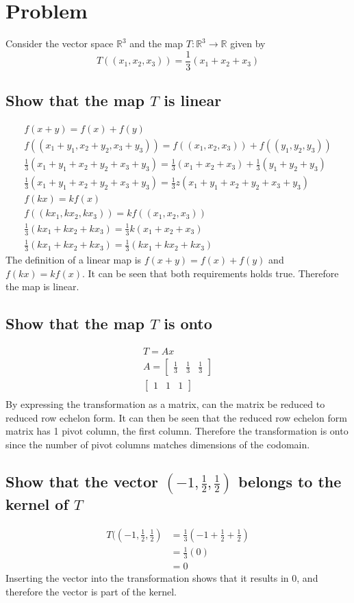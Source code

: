 \documentclass[12pt, a4paper]{article}
\begin{document}
	\section{Problem}
		Consider the vector space $\mathbb{R}^3$ and the map $T:\mathbb{R}^3\rightarrow \mathbb{R}$ given by
		$$T((x_1,x_2,x_3))=\frac{1}{3}(x_1+x_2+x_3)$$
		\subsection{Show that the map $T$ is linear}
			\begin{align*}
				f(x+y)=f(x)+f(y)\\
				f((x_1+y_1,x_2+y_2,x_3+y_3))=f((x_1,x_2,x_3))+f((y_1,y_2,y_3))\\
				\frac{1}{3}(x_1+y_1+x_2+y_2+x_3+y_3)=\frac{1}{3}(x_1+x_2+x_3)+\frac{1}{3}(y_1+y_2+y_3)\\
				\frac{1}{3}(x_1+y_1+x_2+y_2+x_3+y_3)=\frac{1}{3}z(x_1+y_1+x_2+y_2+x_3+y_3)\\[4mm]
				f(kx)=kf(x)\\
				f((kx_1,kx_2,kx_3))=kf((x_1,x_2,x_3))\\
				\frac{1}{3}(kx_1+kx_2+kx_3)=\frac{1}{3}k(x_1+x_2+x_3)\\
				\frac{1}{3}(kx_1+kx_2+kx_3)=\frac{1}{3}(kx_1+kx_2+kx_3)
			\end{align*}
			The definition of a linear map is $f(x+y)=f(x)+f(y)$ and $f(kx)=kf(x)$. It can be seen that both requirements holds true. Therefore the map is linear.
		\subsection{Show that the map $T$ is onto}
			\begin{align*}
				T=Ax\\
				A=\begin{bmatrix}\frac{1}{3}&\frac{1}{3}&\frac{1}{3}\end{bmatrix}\\
				\begin{bmatrix}1&1&1\end{bmatrix}\\
			\end{align*}
			By expressing the transformation as a matrix, can the matrix be reduced to reduced row echelon form. It can then be seen that the reduced row echelon form matrix has 1 pivot column, the first column. Therefore the transformation is onto since the number of pivot columns matches dimensions of the codomain.
		\subsection{Show that the vector $(-1,\frac{1}{2},\frac{1}{2})$ belongs to the kernel of $T$}
			\begin{align*}
				T((-1,\frac{1}{2},\frac{1}{2})&=\frac{1}{3}(-1+\frac{1}{2}+\frac{1}{2})\\
				&=\frac{1}{3}(0)\\
				&=0
			\end{align*}
			Inserting the vector into the transformation shows that it results in 0, and therefore the vector is part of the kernel.
\end{document}
